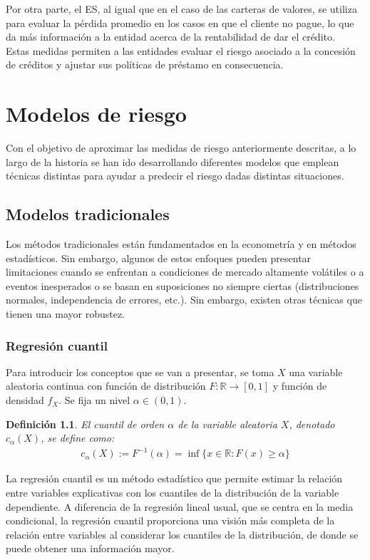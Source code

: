 \documentclass[11pt]{book}
\theoremstyle{plain} %
\newtheorem{definition}{Definición}
\theoremstyle{definition} %
\begin{document}
Por otra parte, el ES, al igual que en el caso de las carteras de valores, se 
utiliza para evaluar la pérdida promedio en los casos en que el cliente no 
pague, lo que da más información a la entidad acerca de la rentabilidad de 
dar el crédito.\\

Estas medidas permiten a las entidades evaluar el riesgo asociado a la 
concesión de créditos y ajustar sus políticas de préstamo en consecuencia.\\


\chapter{Modelos de riesgo}
Con el objetivo de aproximar las medidas de riesgo anteriormente descritas, 
a lo largo de la historia se han ido desarrollando diferentes modelos que 
emplean técnicas distintas para ayudar a predecir el riesgo dadas distintas 
situaciones.
\section{Modelos tradicionales}
Los métodos tradicionales están fundamentados en la econometría y en 
métodos estadísticos. Sin embargo, algunos de estos enfoques pueden presentar 
limitaciones cuando se enfrentan a condiciones de mercado altamente 
volátiles o a eventos inesperados o se basan en suposiciones 
no siempre ciertas (distribuciones normales, independencia de errores, etc.). 
Sin embargo, existen otras técnicas que tienen una mayor robustez. 
\subsection{Regresión cuantil}
Para introducir los conceptos que se van a presentar, se toma $X$ una 
variable aleatoria continua con función de distribución  
$F: \mathbb{R} \to [0,1]$ y función de densidad $f_X$. Se fija un nivel 
$\alpha \in (0,1)$.
\begin{definition}
   El cuantil de orden $\alpha$ de la variable aleatoria $X$, denotado $c_\alpha(X)$, 
   se define como:
      \begin{align*}
         c_\alpha(X) := F^{-1}(\alpha) = \inf \{ x \in \mathbb{R} : F(x) \geq \alpha \}
      \end{align*}
   \end{definition}

La regresión cuantil \cite{K05} es un método estadístico que permite estimar la 
relación entre variables explicativas con los cuantiles de la distribución 
de la variable dependiente. A diferencia de la regresión lineal usual, 
que se centra en la media condicional, la regresión cuantil proporciona una 
visión más completa de la relación entre variables al considerar los cuantiles 
de la distribución, de donde se puede obtener una información mayor.\\
\end{document}
